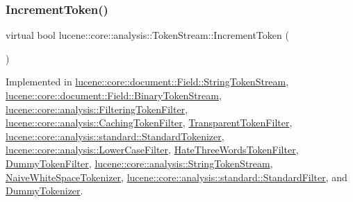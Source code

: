 \subsubsection{\texorpdfstring{Increment\+Token()}{IncrementToken()}}
{\footnotesize\ttfamily virtual bool lucene\+::core\+::analysis\+::\+Token\+Stream\+::\+Increment\+Token (\begin{DoxyParamCaption}{ }\end{DoxyParamCaption})\hspace{0.3cm}{\ttfamily [pure virtual]}}



Implemented in \mbox{\hyperlink{classlucene_1_1core_1_1document_1_1Field_1_1StringTokenStream_a161893ca5de24e392426fea5999334fb}{lucene\+::core\+::document\+::\+Field\+::\+String\+Token\+Stream}}, \mbox{\hyperlink{classlucene_1_1core_1_1document_1_1Field_1_1BinaryTokenStream_a98dee5401b26bdaab935f66a37abae29}{lucene\+::core\+::document\+::\+Field\+::\+Binary\+Token\+Stream}}, \mbox{\hyperlink{classlucene_1_1core_1_1analysis_1_1FilteringTokenFilter_aa1956aa94779023b3f97b667bd819734}{lucene\+::core\+::analysis\+::\+Filtering\+Token\+Filter}}, \mbox{\hyperlink{classlucene_1_1core_1_1analysis_1_1CachingTokenFilter_acea0a0a5ee61ab8831209c96fde49dc8}{lucene\+::core\+::analysis\+::\+Caching\+Token\+Filter}}, \mbox{\hyperlink{classTransparentTokenFilter_ae0bc79516b4f3fae3af29a9d05b4acf6}{Transparent\+Token\+Filter}}, \mbox{\hyperlink{classlucene_1_1core_1_1analysis_1_1standard_1_1StandardTokenizer_a5702119d01489ede9396db0794a98c41}{lucene\+::core\+::analysis\+::standard\+::\+Standard\+Tokenizer}}, \mbox{\hyperlink{classlucene_1_1core_1_1analysis_1_1LowerCaseFilter_a0e32bf7c330bccfb7ad3c68a374683a7}{lucene\+::core\+::analysis\+::\+Lower\+Case\+Filter}}, \mbox{\hyperlink{classHateThreeWordsTokenFilter_ad843fcf23da10776311702c619c02560}{Hate\+Three\+Words\+Token\+Filter}}, \mbox{\hyperlink{classDummyTokenFilter_a6a57ec2684cc58f61ec807bbebabae63}{Dummy\+Token\+Filter}}, \mbox{\hyperlink{classlucene_1_1core_1_1analysis_1_1StringTokenStream_a059da09c86bcf50a286803cad1b99d10}{lucene\+::core\+::analysis\+::\+String\+Token\+Stream}}, \mbox{\hyperlink{classNaiveWhiteSpaceTokenizer_aa1dcc35eedacdb6107441cb9010d60b0}{Naive\+White\+Space\+Tokenizer}}, \mbox{\hyperlink{classlucene_1_1core_1_1analysis_1_1standard_1_1StandardFilter_a11958d89cb4aed281d083db7be0e8680}{lucene\+::core\+::analysis\+::standard\+::\+Standard\+Filter}}, and \mbox{\hyperlink{classDummyTokenizer_a11402de15d04027b30ce918814e1723d}{Dummy\+Tokenizer}}.

